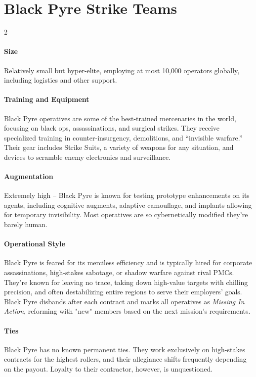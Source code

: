 \section*{Black Pyre Strike Teams}
\vspace{5mm}
\begin{multicols}{2}
\paragraph{Size}
Relatively small but hyper-elite, employing at most 10,000 operators globally, including logistics and other support. 
\paragraph{Training and Equipment}
Black Pyre operatives are some of the best-trained mercenaries in the world, focusing on black ops, assassinations, and surgical strikes. They receive specialized training in counter-insurgency, demolitions, and “invisible warfare.” Their gear includes Strike Suits, a variety of weapons for any situation, and devices to scramble enemy electronics and surveillance.
\paragraph{Augmentation}
Extremely high – Black Pyre is known for testing prototype enhancements on its agents, including cognitive augments, adaptive camouflage, and implants allowing for temporary invisibility. Most operatives are so cybernetically modified they’re barely human.
\paragraph{Operational Style}
Black Pyre is feared for its merciless efficiency
	and is typically hired for corporate assassinations,
	high-stakes sabotage,
	or shadow warfare against rival PMCs.
They’re known for leaving no trace,
	taking down high-value targets with chilling precision,
	and often destabilizing entire regions to serve their employers’ goals.
Black Pyre disbands after each contract
	and marks all operatives as \emph{Missing In Action},
	reforming with "new" members based on the next mission’s requirements.
\paragraph{Ties}
Black Pyre has no known permanent ties.
They work exclusively on high-stakes contracts for the highest rollers, and their allegiance shifts frequently depending on the payout.
Loyalty to their contractor, however, is unquestioned.

\end{multicols}
